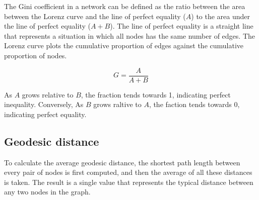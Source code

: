 The Gini coefficient in a network can be defined as the ratio between the area between the Lorenz curve and the line of perfect equality ($A$) to the area under the line of perfect equality ($A + B$). The line of perfect equality is a straight line that represents a situation in which all nodes has the same number of edges. The Lorenz curve plots the cumulative proportion of edges against the cumulative proportion of nodes.

$$
G = \frac{A}{A + B}
$$

As $A$ grows relative to $B$, the fraction tends towards 1, indicating perfect inequality. Conversely, As $B$ grows raltive to $A$, the faction tends towards 0, indicating perfect equality.

\subsection{Geodesic distance}

To calculate the average geodesic distance, the shortest path length between every pair of nodes 
is first computed, and then the average of all these distances is taken. The result is a single value 
that represents the typical distance between any two nodes in the graph.

